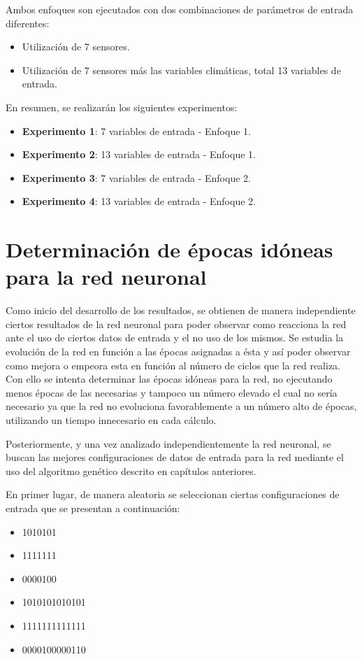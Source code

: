 Ambos enfoques son ejecutados con dos combinaciones de parámetros de entrada diferentes:

\begin{itemize}
    \item Utilización de 7 sensores.
    \item Utilización de 7 sensores más las variables climáticas, total 13 variables de entrada.
\end{itemize}


En resumen, se realizarán los siguientes experimentos:
\begin{itemize}
    \item \textbf{Experimento 1}: 7 variables de entrada - Enfoque 1.
    \item \textbf{Experimento 2}: 13 variables de entrada - Enfoque 1.
    \item \textbf{Experimento 3}: 7 variables de entrada - Enfoque 2.
    \item \textbf{Experimento 4}: 13 variables de entrada - Enfoque 2.
\end{itemize}


\section{Determinación de épocas idóneas para la red neuronal}\label{sec:epocas}


Como inicio del desarrollo de los resultados, se obtienen de manera independiente ciertos resultados de la red neuronal para poder observar como reacciona la red ante el uso de ciertos datos de entrada y el no uso de los mismos. Se estudia la evolución de la red en función a las épocas asignadas a ésta y así poder observar como mejora o empeora esta en función al número de ciclos que la red realiza. Con ello se intenta determinar las épocas idóneas para la red, no ejecutando menos épocas de las necesarias y tampoco un número elevado el cual no sería necesario ya que la red no evoluciona favorablemente a un número alto de épocas, utilizando un tiempo innecesario en cada cálculo.

Posteriormente, y una vez analizado independientemente la red neuronal, se buscan las mejores configuraciones de datos de entrada para la red mediante el uso del algoritmo genético descrito en capítulos anteriores.


En primer lugar, de manera aleatoria se seleccionan ciertas configuraciones de entrada que se presentan a continuación:

\begin{itemize}
    \item 1010101
    \item 1111111
    \item 0000100
    \item 1010101010101
    \item 1111111111111
    \item 0000100000110
\end{itemize}

